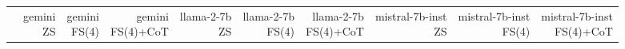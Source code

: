 \begin{table*}[h!]
\begin{adjustbox}{width=2\columnwidth,center}
\begin{tabular}{lrrr|rrr|rrr}
\toprule
{} &
\makecell{gemini \\ ZS} &
\makecell{gemini \\ FS(4)} &
\makecell{gemini \\ FS(4)+CoT} &
\makecell{llama-2-7b \\ ZS} &
\makecell{llama-2-7b \\ FS(4)} &
\makecell{llama-2-7b \\ FS(4)+CoT} &
\makecell{mistral-7b-inst \\ ZS} &
\makecell{mistral-7b-inst \\ FS(4)} &
\makecell{mistral-7b-inst \\ FS(4)+CoT} \\


\end{tabular}
\end{adjustbox}
\end{table*}
